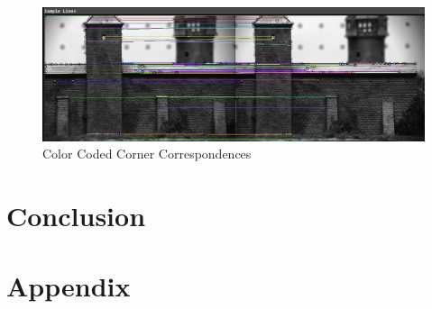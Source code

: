 \documentclass[letterpaper,11pt]{article}
\begin{document}
\begin{figure}[h]
  \centering
  \includegraphics[width=\linewidth]{images/correspondences.png}
  \caption{Color Coded Corner Correspondences}
  \label{fig:sfig1}
\end{figure}



\section{Conclusion}


\section{Appendix}
\end{document}
